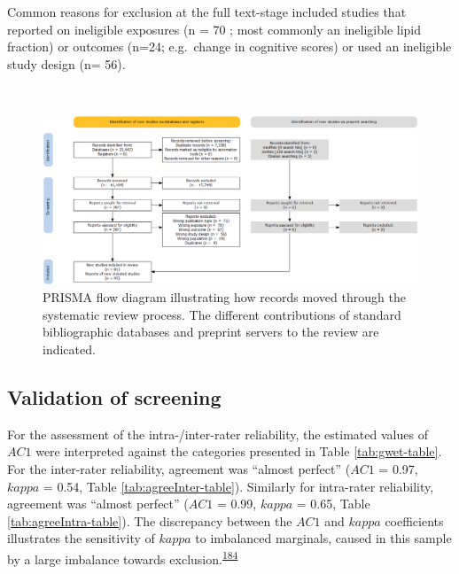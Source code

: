 \documentclass[a4paper, twoside]{templates/ociamthesis}
\newcommand{\blandscape}{\begin{landscape}}
\newcommand{\elandscape}{\end{landscape}}
\begin{document}
Common reasons for exclusion at the full text-stage included studies that reported on ineligible exposures (n = 70 ; most commonly an ineligible lipid fraction) or outcomes (n=24; e.g.~change in cognitive scores) or used an ineligible study design (n= 56).

\blandscape{}

~





\begin{figure}[H]
\includegraphics[width=1\linewidth]{figures/sys-rev/prismaflow} \caption[PRISMA flow diagram]{PRISMA flow diagram illustrating how records moved through the systematic review process. The different contributions of standard bibliographic databases and preprint servers to the review are indicated.}\label{fig:prisma-flow-fig}
\end{figure}

\elandscape{}

\hypertarget{validation-of-screening}{%
\subsection{Validation of screening}\label{validation-of-screening}}

For the assessment of the intra-/inter-rater reliability, the estimated values of \(AC1\) were interpreted against the categories presented in Table \ref{tab:gwet-table}. For the inter-rater reliability, agreement was ``almost perfect'' (\(AC1\) = 0.97, \(kappa\) = 0.54, Table \ref{tab:agreeInter-table}). Similarly for intra-rater reliability, agreement was ``almost perfect'' (\(AC1\) = 0.99, \(kappa\) = 0.65, Table \ref{tab:agreeIntra-table}). The discrepancy between the \(AC1\) and \(kappa\) coefficients illustrates the sensitivity of \(kappa\) to imbalanced marginals, caused in this sample by a large imbalance towards exclusion.\textsuperscript{\protect\hyperlink{ref-feinstein1990}{184}}
\end{document}
